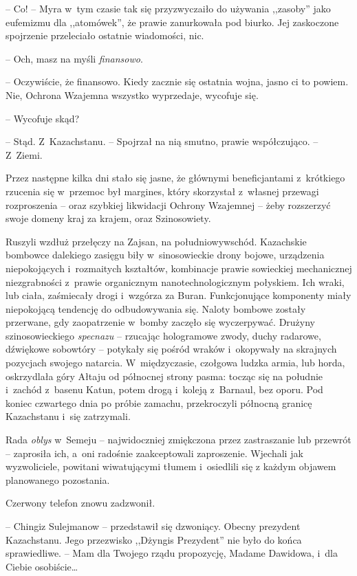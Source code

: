 \documentclass[oneside,polish,11pt,sfheadings]{mwbk}
\begin{document}
-- Co! -- Myra w~tym czasie tak się przyzwyczaiło do używania ,,zasoby''
jako eufemizmu dla ,,atomówek'', że prawie zanurkowała pod biurko. Jej
zaskoczone spojrzenie przeleciało ostatnie wiadomości, nic.

-- Och, masz na myśli \textit{finansowo}.

-- Oczywiście, że finansowo. Kiedy zacznie się ostatnia wojna, jasno ci to powiem. Nie, Ochrona Wzajemna wszystko wyprzedaje, wycofuje się.

-- Wycofuje skąd?

-- Stąd. Z~Kazachstanu. -- Spojrzał na nią smutno, prawie współczująco. -- Z~Ziemi.

Przez następne kilka dni stało się jasne, że głównymi beneficjantami z~krótkiego rzucenia się w~przemoc był margines, który skorzystał z~własnej przewagi rozproszenia -- oraz szybkiej likwidacji Ochrony
Wzajemnej -- żeby rozszerzyć swoje domeny kraj za krajem, oraz
Szinosowiety.

Ruszyli wzdłuż przełęczy na Zajsan, na południowy\dywiz wschód. Kazachskie
bombowce dalekiego zasięgu biły w~sinosowieckie drony bojowe, urządzenia
niepokojących i~rozmaitych kształtów, kombinacje prawie sowieckiej
mechanicznej niezgrabności z~prawie organicznym nanotechnologicznym
połyskiem. Ich wraki, lub ciała, zaśmiecały drogi i~wzgórza za Buran.
Funkcjonujące komponenty miały niepokojącą tendencję do odbudowywania
się. Naloty bombowe zostały przerwane, gdy zaopatrzenie w~bomby zaczęło
się wyczerpywać. Drużyny szinosowieckiego \textit{specnazu} -- rzucając
hologramowe zwody, duchy radarowe, dźwiękowe sobowtóry -- potykały się
pośród wraków i~okopywały na skrajnych pozycjach swojego natarcia. W~międzyczasie, czołgowa ludzka armia, lub horda, oskrzydlała góry Ałtaju
od północnej strony pasma: tocząc się na południe i~zachód z~basenu
Katun, potem drogą i~koleją z~Barnaul, bez oporu. Pod koniec czwartego
dnia po próbie zamachu, przekroczyli północną granicę Kazachstanu i~się
zatrzymali.

Rada \textit{oblys} w~Semeju -- najwidoczniej zmiękczona przez zastraszanie
lub przewrót -- zaprosiła ich, a~oni radośnie zaakceptowali zaproszenie.
Wjechali jak wyzwoliciele, powitani wiwatującymi tłumem i~osiedlili się
z każdym objawem planowanego pozostania.

Czerwony telefon znowu zadzwonił.

-- Chingiz Sulejmanow -- przedstawił się dzwoniący. Obecny prezydent
Kazachstanu. Jego przezwisko ,,Dżyngis Prezydent'' nie było do końca
sprawiedliwe. -- Mam dla Twojego rządu propozycję, Madame Dawidowa, i~dla
Ciebie osobiście\ldots
\end{document}
